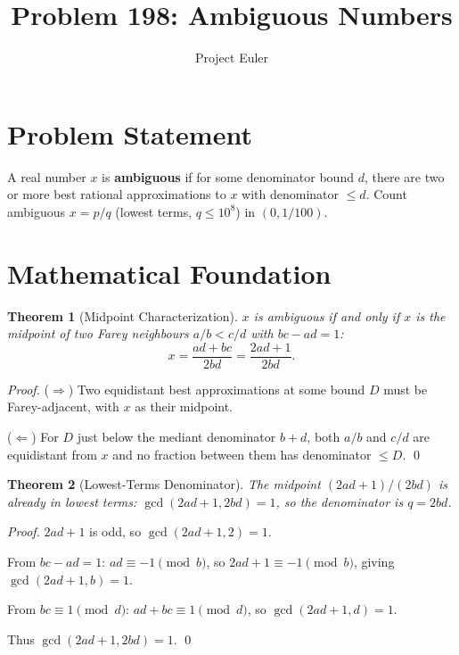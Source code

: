 \documentclass[12pt]{article}
\title{Problem 198: Ambiguous Numbers}
\author{Project Euler}
\date{}
\newtheorem{theorem}{Theorem}
\begin{document}
\maketitle

\section{Problem Statement}

A real number $x$ is \textbf{ambiguous} if for some denominator bound $d$, there are two or more best rational approximations to $x$ with denominator $\leq d$. Count ambiguous $x = p/q$ (lowest terms, $q \leq 10^8$) in $(0, 1/100)$.

\section{Mathematical Foundation}

\begin{theorem}[Midpoint Characterization]
$x$ is ambiguous if and only if $x$ is the midpoint of two Farey neighbours $a/b < c/d$ with $bc - ad = 1$:
\[
x = \frac{ad + bc}{2bd} = \frac{2ad + 1}{2bd}.
\]
\end{theorem}

\begin{proof}
($\Rightarrow$) Two equidistant best approximations at some bound $D$ must be Farey-adjacent, with $x$ as their midpoint.

($\Leftarrow$) For $D$ just below the mediant denominator $b + d$, both $a/b$ and $c/d$ are equidistant from $x$ and no fraction between them has denominator $\leq D$. \qed
\end{proof}

\begin{theorem}[Lowest-Terms Denominator]
The midpoint $(2ad+1)/(2bd)$ is already in lowest terms: $\gcd(2ad+1, 2bd) = 1$, so the denominator is $q = 2bd$.
\end{theorem}

\begin{proof}
$2ad + 1$ is odd, so $\gcd(2ad+1, 2) = 1$.

From $bc - ad = 1$: $ad \equiv -1 \pmod{b}$, so $2ad + 1 \equiv -1 \pmod{b}$, giving $\gcd(2ad+1, b) = 1$.

From $bc \equiv 1 \pmod{d}$: $ad + bc \equiv 1 \pmod{d}$, so $\gcd(2ad+1, d) = 1$.

Thus $\gcd(2ad+1, 2bd) = 1$. \qed
\end{proof}
\end{document}
